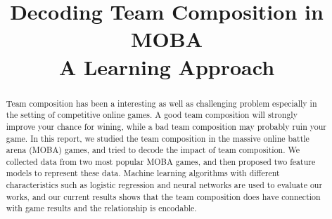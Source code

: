 \documentclass[conference]{IEEEtran}
\begin{document}
%
\title{Decoding Team Composition in MOBA \\ A Learning Approach}


\author{
\and
{}
\and
{}
}

\maketitle


\begin{abstract}
Team composition has been a interesting as well as challenging problem especially in the setting of competitive online games. A good team composition will strongly improve your chance for wining, while a bad team composition may probably ruin your game.
In this report, we studied the team composition in the massive online battle arena (MOBA) games, and tried to decode the impact of team composition. We collected data from two most popular MOBA games, and then proposed two feature models to represent these data. Machine learning algorithms with different characteristics such as logistic regression and neural networks are used to evaluate our works, and our current results shows that the team composition does have connection with game results and the relationship is encodable.
\end{abstract}
\end{document}
